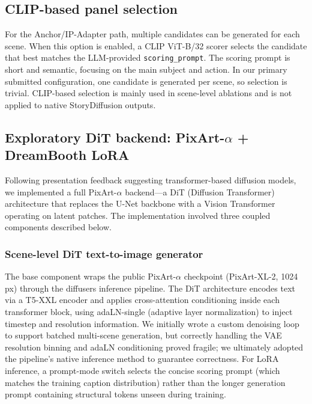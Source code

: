 \subsection{CLIP-based panel selection}
\label{sec:clip}

For the Anchor/IP-Adapter path, multiple candidates can be generated for each scene.
When this option is enabled, a CLIP ViT-B/32 scorer selects the candidate that best matches the LLM-provided \texttt{scoring\_prompt}.
The scoring prompt is short and semantic, focusing on the main subject and action.
In our primary submitted configuration, one candidate is generated per scene, so selection is trivial.
CLIP-based selection is mainly used in scene-level ablations and is not applied to native StoryDiffusion outputs.

\subsection{Exploratory DiT backend: PixArt-$\alpha$ + DreamBooth LoRA}
\label{sec:dit_method}

Following presentation feedback suggesting transformer-based diffusion models, we implemented a full PixArt-$\alpha$ backend---a DiT (Diffusion Transformer) architecture that replaces the U-Net backbone with a Vision Transformer operating on latent patches. The implementation involved three coupled components described below.

\subsubsection{Scene-level DiT text-to-image generator}

The base component wraps the public PixArt-$\alpha$ checkpoint (PixArt-XL-2, 1024\,px) through the diffusers inference pipeline. The DiT architecture encodes text via a T5-XXL encoder and applies cross-attention conditioning inside each transformer block, using adaLN-single (adaptive layer normalization) to inject timestep and resolution information. We initially wrote a custom denoising loop to support batched multi-scene generation, but correctly handling the VAE resolution binning and adaLN conditioning proved fragile; we ultimately adopted the pipeline's native inference method to guarantee correctness. For LoRA inference, a prompt-mode switch selects the concise scoring prompt (which matches the training caption distribution) rather than the longer generation prompt containing structural tokens unseen during training.


